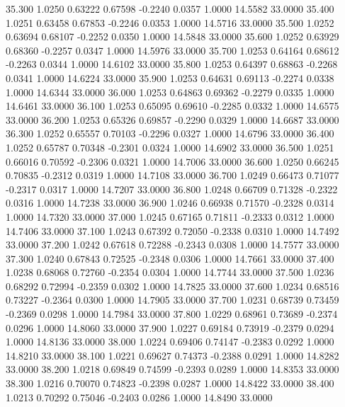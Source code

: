   35.300   1.0250   0.63222   0.67598  -0.2240   0.0357   1.0000  14.5582  33.0000
  35.400   1.0251   0.63458   0.67853  -0.2246   0.0353   1.0000  14.5716  33.0000
  35.500   1.0252   0.63694   0.68107  -0.2252   0.0350   1.0000  14.5848  33.0000
  35.600   1.0252   0.63929   0.68360  -0.2257   0.0347   1.0000  14.5976  33.0000
  35.700   1.0253   0.64164   0.68612  -0.2263   0.0344   1.0000  14.6102  33.0000
  35.800   1.0253   0.64397   0.68863  -0.2268   0.0341   1.0000  14.6224  33.0000
  35.900   1.0253   0.64631   0.69113  -0.2274   0.0338   1.0000  14.6344  33.0000
  36.000   1.0253   0.64863   0.69362  -0.2279   0.0335   1.0000  14.6461  33.0000
  36.100   1.0253   0.65095   0.69610  -0.2285   0.0332   1.0000  14.6575  33.0000
  36.200   1.0253   0.65326   0.69857  -0.2290   0.0329   1.0000  14.6687  33.0000
  36.300   1.0252   0.65557   0.70103  -0.2296   0.0327   1.0000  14.6796  33.0000
  36.400   1.0252   0.65787   0.70348  -0.2301   0.0324   1.0000  14.6902  33.0000
  36.500   1.0251   0.66016   0.70592  -0.2306   0.0321   1.0000  14.7006  33.0000
  36.600   1.0250   0.66245   0.70835  -0.2312   0.0319   1.0000  14.7108  33.0000
  36.700   1.0249   0.66473   0.71077  -0.2317   0.0317   1.0000  14.7207  33.0000
  36.800   1.0248   0.66709   0.71328  -0.2322   0.0316   1.0000  14.7238  33.0000
  36.900   1.0246   0.66938   0.71570  -0.2328   0.0314   1.0000  14.7320  33.0000
  37.000   1.0245   0.67165   0.71811  -0.2333   0.0312   1.0000  14.7406  33.0000
  37.100   1.0243   0.67392   0.72050  -0.2338   0.0310   1.0000  14.7492  33.0000
  37.200   1.0242   0.67618   0.72288  -0.2343   0.0308   1.0000  14.7577  33.0000
  37.300   1.0240   0.67843   0.72525  -0.2348   0.0306   1.0000  14.7661  33.0000
  37.400   1.0238   0.68068   0.72760  -0.2354   0.0304   1.0000  14.7744  33.0000
  37.500   1.0236   0.68292   0.72994  -0.2359   0.0302   1.0000  14.7825  33.0000
  37.600   1.0234   0.68516   0.73227  -0.2364   0.0300   1.0000  14.7905  33.0000
  37.700   1.0231   0.68739   0.73459  -0.2369   0.0298   1.0000  14.7984  33.0000
  37.800   1.0229   0.68961   0.73689  -0.2374   0.0296   1.0000  14.8060  33.0000
  37.900   1.0227   0.69184   0.73919  -0.2379   0.0294   1.0000  14.8136  33.0000
  38.000   1.0224   0.69406   0.74147  -0.2383   0.0292   1.0000  14.8210  33.0000
  38.100   1.0221   0.69627   0.74373  -0.2388   0.0291   1.0000  14.8282  33.0000
  38.200   1.0218   0.69849   0.74599  -0.2393   0.0289   1.0000  14.8353  33.0000
  38.300   1.0216   0.70070   0.74823  -0.2398   0.0287   1.0000  14.8422  33.0000
  38.400   1.0213   0.70292   0.75046  -0.2403   0.0286   1.0000  14.8490  33.0000
